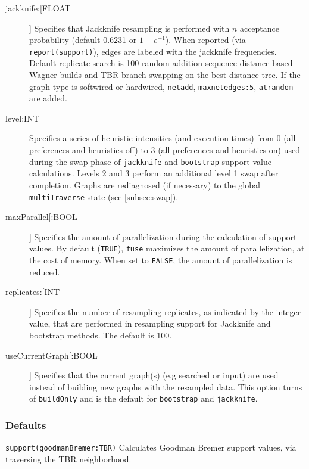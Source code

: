 \begin{description}
		\item[jackknife:[FLOAT]] Specifies that Jackknife resampling is performed with $n$ 
		acceptance probability (default 0.6231 or $1 - e^{-1}$). When reported (via 
		\texttt{report(support)}), edges are labeled with the jackknife frequencies. Default 
		replicate search is 100 random addition sequence distance-based Wagner builds 
		and TBR branch swapping on the best distance tree. If the graph type is softwired 
		or hardwired, \texttt{netadd}, \texttt{maxnetedges:5}, \texttt{atrandom} are added. 
		
		\item[level:INT] Specifies a series of heuristic intensities (and execution times) from 
		   0 (all preferences and heuristics off) to 3 (all preferences and heuristics on) used 
		   during the swap phase of \texttt{jackknife} and \texttt{bootstrap} support value 
		   calculations. Levels 2 and 3 perform an additional level 1 swap after completion. 
		   Graphs are rediagnosed (if necessary) to the global \texttt{multiTraverse} state
		   (see \ref{subsec:swap}).
		
		\item[maxParallel[:BOOL]] Specifies the amount of parallelization during the 
		   calculation of support values. By default (\texttt{TRUE}), \texttt{fuse} maximizes 
		   	the amount of parallelization, at the cost of memory. When set to \texttt{FALSE}, 
			the amount of parallelization is reduced. 

		\item[replicates:[INT]] Specifies the number of resampling replicates, as indicated 
	          by the integer value, that are performed in resampling support for Jackknife and 
	          bootstrap methods. The default is 100.
		
		\item[useCurrentGraph[:BOOL]] Specifies that the current graph(s) (e.g searched or input)
			are used instead of building new graphs with the resampled data.  This option turns of
			\texttt{buildOnly} and is the default for \texttt{bootstrap} and \texttt{jackknife}. 
		
	\end{description}	
		
	\subsubsection{Defaults}
		\texttt{support(goodmanBremer:TBR)} Calculates Goodman Bremer support values, 
		via traversing the TBR neighborhood.
		
